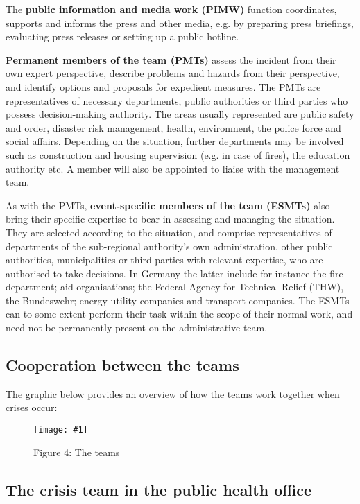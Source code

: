 \documentclass{article}
\newlength{\imgwidth}
\newcommand\scaledgraphics[2]{%
                
\settowidth{\imgwidth}{\texttt{[image: \#1]}}%
                
\setlength{\imgwidth}{\minof{\imgwidth}{#2\textwidth}}%
                
\texttt{[image: \#1]}%
                
}
\begin{document}
The \textbf{public information and media work (PIMW)} function coordinates, supports and informs the press and other media, e.g. by preparing press briefings, evaluating press releases or setting up a public hotline.


\textbf{Permanent members of the team (PMTs)} assess the incident from their own expert perspective, describe problems and hazards from their perspective, and identify options and proposals for expedient measures. The PMTs are representatives of necessary departments, public authorities or third parties who possess decision-making authority. The areas usually represented are public safety and order, disaster risk management, health, environment, the police force and social affairs. Depending on the situation, further departments may be involved such as construction and housing supervision (e.g. in case of fires), the education authority etc. A member will also be appointed to liaise with the management team.


As with the PMTs, \textbf{event-specific members of the team} \textbf{(ESMTs) }also bring their specific expertise to bear in assessing and\textbf{ }managing the situation. They are selected according to the situation, and comprise representatives of departments of the sub-regional authority's own administration, other public authorities, municipalities or third parties with relevant expertise, who are authorised to take decisions. In Germany the latter include for instance the fire department; aid organisations; the Federal Agency for Technical Relief (THW), the Bundeswehr; energy utility companies and transport companies. The ESMTs can to some extent perform their task within the scope of their normal work, and need not be permanently present on the administrative team.


\subsection{Cooperation between the teams}\label{H9060171}



The graphic below provides an overview of how the teams work together when crises occur:  

\begin{figure}
\scaledgraphics{79e588fd-6cf6-494d-ab3b-92e25bbd1c8b.png}{1}
\caption*{Figure 4: The teams}\label{F84973601}
\end{figure}


\subsection{The crisis team in the public health office}\label{H2640525}
\end{document}
